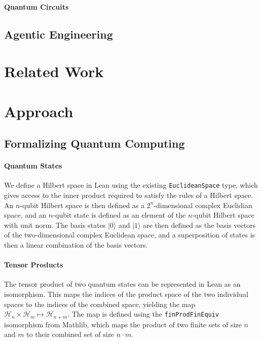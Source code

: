 \documentclass[letterpaper]{article} %
\begin{document}
\paragraph{Quantum Circuits}



\subsection{Agentic Engineering}



\section{Related Work}




\section{Approach}

\subsection{Formalizing Quantum Computing}

\paragraph{Quantum States}

We define a Hilbert space in Lean using the existing \verb|EuclideanSpace| type,
which gives access to the inner product required to satisfy the rules of a Hilbert space.
An $n$-qubit Hilbert space is then defined as a $2^n$-dimensional complex Euclidian space, and
an $n$-qubit state is defined as an element of the $n$-qubit Hilbert space with unit norm.
The basis states $|0\rangle$ and $|1\rangle$ are then defined as the basis vectors
of the two-dimensional complex Euclidean space, and a superposition of states is then
a linear combination of the basis vectors.

\paragraph{Tensor Products}

The tensor product of two quantum states can be represented in Lean as an isomorphism.
This maps the indices of the product space of the two individual
spaces to the indices of the combined space, yielding
the map $\mathcal{H}_n \times \mathcal{H}_m \mapsto \mathcal{H}_{n+m}$.
The map is defined using the \verb|finProdFinEquiv| isomorphism from Mathlib, which
maps the product of two finite sets of size $n$ and $m$ to their combined set of size $n \cdot m$.
\end{document}
